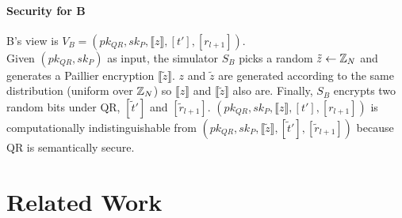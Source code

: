 \documentclass[11pt]{article}
\newcommand{\llb}{\llbracket}
\newcommand{\rrb}{\rrbracket}
\begin{document}
	\paragraph{Security for B} B's view is $V_B = (pk_{QR}, sk_{P}, \llb z \rrb, [t'], [r_{l+1}])$.\\
	Given $(pk_{QR}, sk_{P})$ as input, the simulator $S_B$ picks a random $\tilde{z} \leftarrow \mathbb{Z}_N$ and generates a Paillier encryption $\llb \tilde{z} \rrb$. $z$ and $\tilde{z}$ are generated according to the same distribution (uniform over $\mathbb{Z}_N$) so $\llb z \rrb$ and $\llb \tilde{z} \rrb$ also are. Finally, $S_B$ encrypts two random bits under QR, $[\tilde{t}']$ and $[\tilde{r}_{l+1}]$. $(pk_{QR}, sk_{P}, \llb z \rrb, [t'], [r_{l+1}])$ is computationally indistinguishable from $(pk_{QR}, sk_{P}, \llb \tilde{z} \rrb, [\tilde{t}'], [\tilde{r}_{l+1}])$ because QR is semantically secure. 



\section{Related Work} %
\label{sec:related_work}
        
\end{document}
